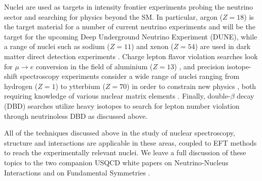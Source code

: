 Nuclei are used as targets in intensity frontier experiments probing the neutrino sector and searching for physics beyond the SM. In particular, argon ($Z=18$) is the target material for a number of current neutrino experiments and will be the target for the upcoming Deep Underground Neutrino Experiment (DUNE), while a range of nuclei such as sodium ($Z=11$) and  xenon ($Z=54$) are used in dark matter direct detection experiments \cite{Undagoitia:2015gya}. Charge lepton flavor violation searches look for $\mu\to e$ conversion in the field of aluminium ($Z=13$) \cite{Albrecht:2013wet}, and precision isotope-shift spectroscopy experiments consider a wide range of nuclei ranging from hydrogen ($Z=1$) to ytterbium ($Z=70$) in  order to constrain new physics \cite{Delaunay:2016brc,Delaunay:2017dku}, both requiring knowledge of various nuclear matrix elements \cite{Chang:2017eiq}. Finally, double-$\beta$ decay (DBD) searches utilize heavy isotopes to search for lepton number violation through neutrinoless DBD \cite{DellOro:2016tmg,Engel:2016xgb} as discussed above.

All of the techniques discussed above in the study of nuclear spectroscopy, structure and interactions are applicable in these areas, coupled to EFT methods to reach the experimentally relevant nuclei. We leave a full discussion of these topics to the two companion USQCD white papers on Neutrino-Nucleus Interactions \cite{Kronfeld:2019nfb} and on Fundamental Symmetries \cite{Cirigliano:2019jig}.



